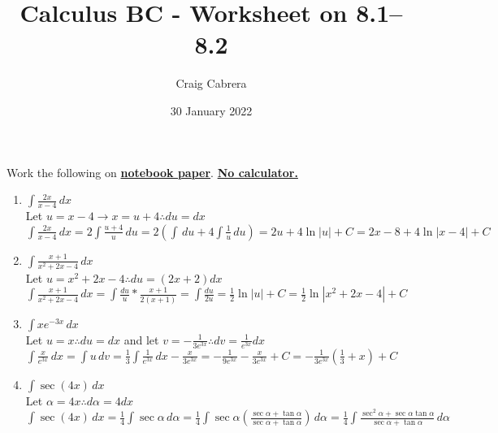 \documentclass[10pt, letterpaper]{report}
\title{Calculus BC - Worksheet on 8.1--8.2}
\author{Craig Cabrera}
\date{30 January 2022}
\begin{document}
\maketitle
Work the following on \textbf{\underline{notebook paper}}. \textbf{\underline{No calculator.}}
\begin{enumerate}
  \item{$\int{\frac{2x}{x-4}}\,dx$} \\

    Let $u=x-4\rightarrow x=u+4\therefore du=dx$ \\

    $\int{\frac{2x}{x-4}}\,dx=2\int{\frac{u+4}{u}}\,du=
    2\left(\int\,du+4\int{\frac{1}{u}}\,du\right)=
    2u+4\ln{|u|}+C=2x-8+4\ln{|x-4|}+C$ \\

  \item{$\int{\frac{x+1}{x^{2}+2x-4}}\,dx$} \\

    Let $u=x^{2}+2x-4\therefore du=(2x+2)dx$ \\

    $\int{\frac{x+1}{x^{2}+2x-4}}\,dx=\int{\frac{du}{u}}*\frac{x+1}{2(x+1)}=\int{\frac{du}{2u}}=
    \frac{1}{2}\ln{|u|}+C=\frac{1}{2}\ln{|x^{2}+2x-4|}+C$ \\

  \item{$\int{xe^{-3x}}\,dx$} \\

    Let $u=x\therefore du=dx$ and let $v=-\frac{1}{3e^{3x}}\therefore dv=\frac{1}{e^{3x}}dx$ \\

    $\int{\frac{x}{e^{3x}}}\,dx=\int{u}\,dv=
    \frac{1}{3}\int{\frac{1}{e^{3x}}}\,dx-\frac{x}{3e^{3x}}=
    -\frac{1}{9e^{3x}}-\frac{x}{3e^{3x}}+C=
    -\frac{1}{3e^{3x}}\left(\frac{1}{3}+x\right)+C$ \\

  \item{$\int{\sec{(4x)}}\,dx$} \\

    Let $\alpha=4x\therefore d\alpha=4dx$ \\

    $\int{\sec{(4x)}}\,dx=\frac{1}{4}\int{\sec{\alpha}}\,d\alpha=
    \frac{1}{4}\int{\sec{\alpha}\left(\frac{\sec{\alpha}+\tan{\alpha}}{\sec{\alpha}+\tan{\alpha}}\right)}\,d\alpha=
    \frac{1}{4}\int{\frac{\sec^{2}{\alpha}+\sec{\alpha}\tan{\alpha}}{\sec{\alpha}+\tan{\alpha}}}\,d\alpha$ \\


\end{enumerate}
\end{document}

